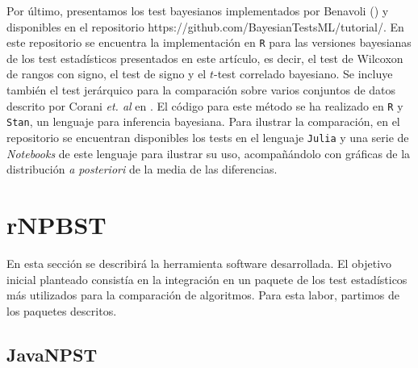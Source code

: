 	Por último, presentamos los test bayesianos implementados
por Benavoli (\cite{DBLP:journals/corr/BenavoliCDZ16}) y 
disponibles en el repositorio 
{https://github.com/BayesianTestsML/tutorial/}. 
En este repositorio se encuentra la implementación en 
\texttt{R} para las versiones bayesianas de los test 
estadísticos presentados en este artículo, es decir, 
el test de Wilcoxon de rangos con signo, el test de signo
y el $t$-test correlado bayesiano. Se incluye también el
test jerárquico para la comparación sobre varios conjuntos
de datos descrito por Corani \textit{et. al} en \cite{coranistatistical}. 
El código para este método se ha realizado
en \texttt{R} y \texttt{Stan}, un lenguaje para inferencia
bayesiana. Para ilustrar la comparación, en el repositorio
se encuentran disponibles los tests en el lenguaje \texttt{Julia} 
y una serie de \textit{Notebooks} 
de este lenguaje para ilustrar su uso, acompañándolo
con gráficas de la distribución \textit{a posteriori}
de la media de las diferencias.
	
	 
\section{rNPBST}

	En esta sección se describirá la herramienta software
desarrollada. El objetivo inicial planteado consistía en
la integración en un paquete de los test estadísticos
más utilizados para la comparación de algoritmos. Para
esta labor, partimos de los paquetes descritos.

\subsection*{JavaNPST}

